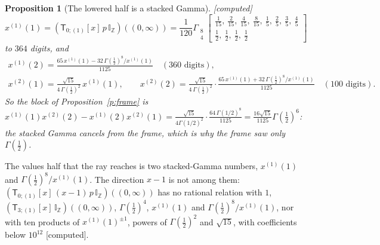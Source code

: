 \documentclass[11pt]{article}
\newcommand{\sT}{\mathsf T}
\newcommand{\Gst}[4]{\Gamma_{\substack{#1\\#2}}\!\begin{bmatrix}#3\\#4\end{bmatrix}}
\newcommand{\IZ}{\mathbb I_{\mathbb Z}}
\newcommand{\Tx}[3]{(\sT_{#1;(1)}[x]\,#2)((#3,\infty))}
\theoremstyle{plain}
\newtheorem{proposition}{Proposition}[section]
\theoremstyle{definition}
\theoremstyle{remark}
\newcommand{\computed}{\textup{[computed]}}
\begin{document}
\begin{proposition}[The lowered half is a stacked Gamma]\label{p:stackedhalf}\computed\
\[
x^{(1)}(1)=\Tx{0}{p\,\IZ}{0}=\frac1{120}\Gst84{\tfrac1{15},\ \tfrac2{15},\ \tfrac4{15},\ \tfrac8{15},\ \tfrac15,\ \tfrac25,\ \tfrac35,\ \tfrac45}{\tfrac12,\ \tfrac12,\ \tfrac12,\ \tfrac12}
\]
to $364$ digits, and
\begin{gather*}
x^{(1)}(2)=\frac{65\,x^{(1)}(1)-32\,\Gamma(\frac12)^8/x^{(1)}(1)}{1125}\quad(360\text{ digits}),\\
x^{(2)}(1)=\frac{\sqrt{15}}{4\,\Gamma(\frac12)^2}\,x^{(1)}(1),\qquad x^{(2)}(2)=\frac{\sqrt{15}}{4\,\Gamma(\frac12)^2}\cdot\frac{65\,x^{(1)}(1)+32\,\Gamma(\frac12)^8/x^{(1)}(1)}{1125}\quad(100\text{ digits}).
\end{gather*}
So the block of Proposition~\ref{p:frame} is $x^{(1)}(1)x^{(2)}(2)-x^{(1)}(2)x^{(2)}(1)=\frac{\sqrt{15}}{4\Gamma(1/2)^2}\cdot\frac{64\,\Gamma(1/2)^8}{1125}=\frac{16\sqrt{15}}{1125}\Gamma(\frac12)^6$: the stacked Gamma cancels from the frame, which is why the frame saw only $\Gamma(\frac12)$.
\end{proposition}

The values half that the ray reaches is two stacked-Gamma numbers, $x^{(1)}(1)$ and $\Gamma(\frac12)^8/x^{(1)}(1)$. The direction $x-1$ is not among them: $\Tx{0}{(x-1)\,p\,\IZ}{0}$ has no rational relation with $1$, $\Tx{3}{\IZ}{0}$, $\Gamma(\frac12)^4$, $x^{(1)}(1)$ and $\Gamma(\frac12)^8/x^{(1)}(1)$, nor with ten products of $x^{(1)}(1)^{\pm1}$, powers of $\Gamma(\frac12)^2$ and $\sqrt{15}$, with coefficients below $10^{12}$ \computed.
\end{document}
